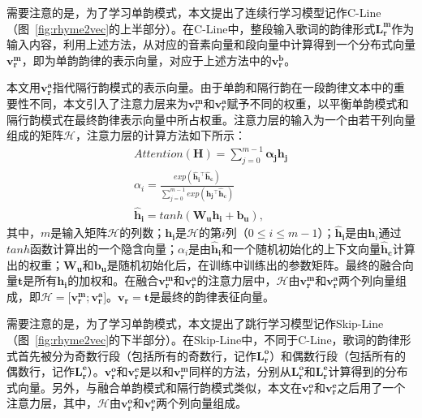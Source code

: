 需要注意的是，为了学习单韵模式，本文提出了连续行学习模型记作C-Line（图~\ref{fig:rhyme2vec}的上半部分）。在C-Line中，整段输入歌词的韵律形式$\bm{L_r^m}$作为输入内容，利用上述方法，从对应的音素向量和段向量中计算得到一个分布式向量$\bm{v_r^m}$，即为单韵韵律的表示向量，对应于上述方法中的$\bm {v_r^b}$。\par

本文用$\bm {v_r^a}$指代隔行韵模式的表示向量。由于单韵和隔行韵在一段韵律文本中的重要性不同，本文引入了注意力层来为$\bm {v_r^m}$和$\bm {v_r^a}$赋予不同的权重，以平衡单韵模式和隔行韵模式在最终韵律表示向量中所占权重。注意力层的输入为一个由若干列向量组成的矩阵$\bm{\mathcal{H}}$，注意力层的计算方法如下所示：
\begin{equation}
  \begin{gathered}
  \label{eq:att}
  Attention(\bm {H}) = \sum_{j=0}^{m-1}{\bm{\alpha{_j} h{_j}}}\\
  \alpha_i= \frac{exp\left( \bm{\hat{h}{_i}^{\top } \hat{h}_{c}}\right) }{\sum_{j=0}^{m-1}{exp\left( \bm {\hat{h}{_j}^\top \hat{h}_{c}} \right) } }\\
\bm{\hat{h}_i}= tanh(\bm {W_u}\bm{h_i}+\bm{b_u}),
  \end{gathered}
\end{equation}
其中，$m$是输入矩阵$\bm{\mathcal{H}}$的列数；$\bm {h_i}$是$\bm{\mathcal{H}}$的第$i$列（$0 \leq i \leq m-1$）；$\bm {\hat{h}_i} $是由$\bm h_i$通过$tanh$函数计算出的一个隐含向量；$\alpha_i$是由$\bm {\hat{h}_i}$和一个随机初始化的上下文向量$\bm{\hat{h}_{c}}$计算出的权重；$\bm {W_u}$和$\bm {b_u}$是随机初始化后，在训练中训练出的参数矩阵。最终的融合向量$\bm t$是所有$\bm {h_i}$的加权和。在融合$\bm {v_r^m}$和$\bm {v_r^a}$的注意力层中，$\bm{\mathcal{H}}$由$\bm {v_r^m}$和$\bm {v_r^a}$两个列向量组成，即$\bm{\mathcal{H}=[\bm {v_r^m}; \bm {v_r^a}}]$。$\bm {v_r}= \bm{t}$是最终的韵律表征向量。\par

需要注意的是，为了学习单韵模式，本文提出了跳行学习模型记作Skip-Line（图~\ref{fig:rhyme2vec}的下半部分）。在Skip-Line中，不同于C-Line，歌词的韵律形式首先被分为奇数行段（包括所有的奇数行，记作$\bm{L_r^o}$）和偶数行段（包括所有的偶数行，记作$\bm{L_r^e}$）。$\bm{v_r^o}$和$ \bm{v_r^e}$是以和$\bm{v_r^m}$同样的方法，分别从$\bm{L_r^o}$和$\bm{L_r^e}$计算得到的分布式向量。另外，与融合单韵模式和隔行韵模式类似，本文在$\bm{v_r^o}$和$\bm{v_r^e}$之后用了一个注意力层，其中，$\bm{\mathcal{H}}$由$\bm{v_r^o}$和$\bm{v_r^e}$两个列向量组成。\par

